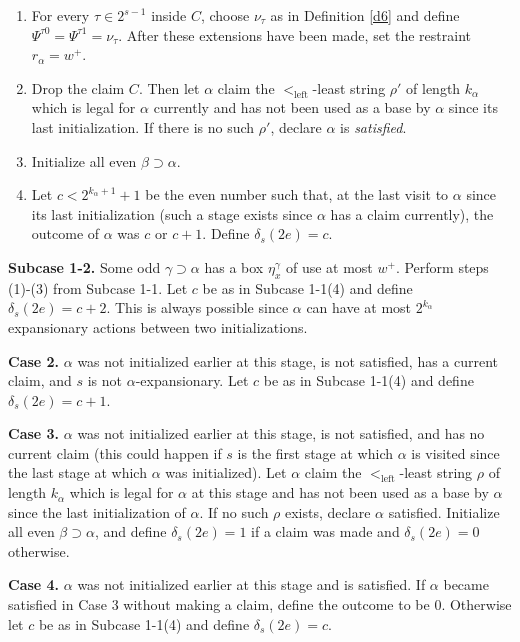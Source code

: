 \documentclass[11pt]{amsart}
\begin{document}
\begin{enumerate}[label=(\arabic*)]
\item For every $\tau\in2^{s-1}$ inside $C$, choose $\nu_\tau$ as in Definition \ref{d6} and
      define $\Psi^{\tau0}=\Psi^{\tau1}=\nu_\tau$.  After these extensions have
      been made, set the restraint $r_\alpha=w^+ $.
  
\item Drop the claim $C$.  Then let $\alpha$ claim the
      $<_{\mathrm{left}}$-least string $\rho'$ of length $k_\alpha$ which is
      legal for $\alpha$ currently and has not been used as a base
      by $\alpha$ since its last initialization. If there is no
      such $\rho'$, declare $\alpha$ is \emph{satisfied}.
\item Initialize all even $\beta\supset\alpha$.
\item Let $c<2^{k_\alpha+1}+1$ be the even number such that, at the last visit to $\alpha$ since its last initialization (such a stage exists since $\alpha$ has a claim currently), the outcome of
      $\alpha$ was $c$ or $c+1$.  Define $\delta_s(2e)=c$.
\end{enumerate}

\textbf{Subcase 1-2.}  Some odd $\gamma\supset\alpha$ has a box
$\eta_x^\gamma$ of use at most $w^+$.  Perform steps (1)-(3) from Subcase 1-1.
Let $c$ be as in Subcase 1-1(4) and define $\delta_s(2e)=c+2$.  This
is always possible since $\alpha$ can have at most $2^{k_\alpha}$ expansionary
actions between two initializations.

\textbf{Case 2.}  $\alpha$ was not initialized earlier at this stage, is not
satisfied, has a current claim, and $s$ is not $\alpha$-expansionary.  Let $c$ be as in Subcase 1-1(4) and define $\delta_s(2e)=c+1$.

\textbf{Case 3.}  $\alpha$ was not initialized earlier at this stage, is not
satisfied, and has no current claim (this could happen if $s$ is
the first stage at which $\alpha$ is visited since the last stage at which
$\alpha$ was initialized).  Let $\alpha$ claim the
$<_{\mathrm{left}}$-least string $\rho$ of length $k_\alpha$ which is legal for
$\alpha$ at this stage and has not been used as a base by $\alpha$ since the
last initialization of $\alpha$.  If no such $\rho$ exists, declare $\alpha$
satisfied.  Initialize all even $\beta\supset\alpha$, 
and define $\delta_s(2e)=1$ if a claim was made
and $\delta_s(2e)=0$ otherwise.

\textbf{Case 4.}  $\alpha$ was not initialized earlier at this stage and is
satisfied.  If $\alpha$ became satisfied in Case 3 without making a claim, define the outcome to be 0.
Otherwise let $c$ be as in Subcase 1-1(4) and define $\delta_s(2e)=c$.
\end{document}
